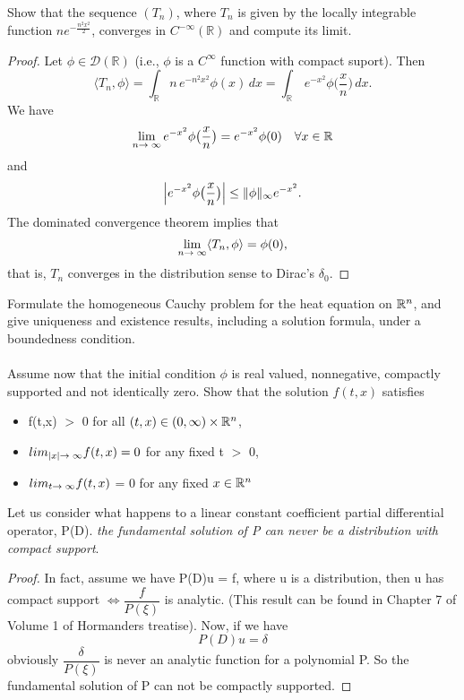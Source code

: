 \begin{ex}
\begin{rm}
Show that the sequence $(T_n)$, where
 $T_n$ is given by the locally integrable function $ne^{-\frac{n^{2}x^{2}}{2}}$,
 converges in $C^{-\infty}(\mathbb{R})$ and compute its limit. 
\end{rm}
\begin{proof}
 Let $\phi\in\mathcal{D}(\mathbb{R})$ (i.e., $\phi$ is a $C^\infty$ function with compact suport). Then
$$
\langle T_n,\phi\rangle=\int_\mathbb{R}n\,e^{-n^2x^2}\phi(x)\,dx=\int_\mathbb{R}\,e^{-x^2}\phi\bigl(\frac xn\bigr)\,dx.
$$
We have 
$$
\lim_{n\rightarrow \;\infty}e^{-x^2}\phi\bigl(\frac xn\bigr)=e^{-x^2}\phi(0)\quad\forall x\in\mathbb{R}
$$
and
$$
\Bigl|e^{-x^2}\phi\bigl(\frac xn\bigr)\Bigr|\le \|\phi\|_\infty e^{-x^2}.
$$
The dominated convergence theorem implies that
$$
\lim_{n\rightarrow \;\infty}\langle T_n,\phi\rangle=\phi(0),
$$
that is, $T_n$ converges in the distribution sense to Dirac's $\delta_0$.
\end{proof}
\end{ex}
\begin{ex}
 Formulate the homogeneous Cauchy problem for the heat equation on $\mathbb{R}^{n}$, and give uniqueness and existence 
results, including a solution formula, under a boundedness condition.
\paragraph{} Assume now that the initial condition $\phi$ is real valued, nonnegative, compactly supported and not 
identically zero. Show that the solution $f(t,x)$ satisfies
\begin{itemize}
 \item f(t,x) $\gt$ 0 for all $(t,x) \in (0, \infty) \times \mathbb{R}^n$,\
\item $lim_{|x| \rightarrow \; \infty}f(t,x) = 0$ for any fixed t $\gt$ 0,
\item $lim_{t \rightarrow \; \infty} f(t,x)$ = 0 for any fixed $x \in \mathbb{R}^n$
\end{itemize}

\end{ex}
\begin{ex}
 Let us consider what happens to a linear constant coefficient partial differential operator, P(D).
\textit{the fundamental solution of P can never be a distribution with compact support}.
\begin{proof}
In fact, assume we have P(D)u = f, where u is a distribution, then u has compact support 
$\iff \dfrac{f}{P(\xi)}$ is analytic. (This result can be found in Chapter 7 of Volume 1 of Hormanders
treatise). 
Now, if we have 
\begin{equation}
 P(D)u = \delta
\end{equation}
obviously $\dfrac{\delta}{P(\xi)}$ is never an analytic function for a polynomial P. So the fundamental solution
of P can not be compactly supported. 
\end{proof}
\end{ex}
